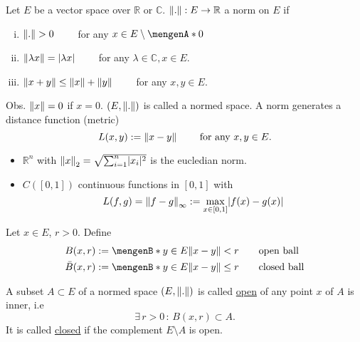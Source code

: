 \begin{definition*}
	Let $E$ be a vector space over $\mathbb{R}$ or $\mathbb{C}$. $\norm{.}:E \to \mathbb{R}$ a norm on $E$ if
	\begin{enumerate}[(i)]
		\item $\norm{.} >0 \qquad $ for any $x \in E \setminus \set{0}$
		\item $\norm{\lambda x} = \abs{\lambda x} \qquad $ for any $\lambda \in \mathbb{C},x \in E$.
		\item $\norm{x+y} \leq \norm{x} + \norm{y} \qquad$ for any $x,y \in E$.
	\end{enumerate}
	Obs. $\norm{x}=0$ if $x =0$. $(E, \norm{.})$ is called a normed space. A norm generates a distance function (metric)
	\[
		L(x,y):= \norm{x-y} \qquad \text{ for any }x,y \in E.
	\]
\end{definition*}
\begin{beispiele}
	\begin{itemize}
		\item $\mathbb{R}^n$ with $\norm{x}_2 = \sqrt{\sum^{n}_{i=1}\abs{x_i}^2}$ is the eucledian norm.
		\item $C([0,1])$ continuous functions in $[0,1]$ with
		\[
			L(f,g)=\norm{f-g}_{\infty}:= \max_{x \in [0,1]}\abs{f(x)-g(x)}
		\]
	\end{itemize}
\end{beispiele}
\begin{definition*}[balls]
	 Let $x \in E$, $r >0$. Define
	\begin{align*}
		B(x,r) &:= \set[y \in E]{\norm{x-y}<r} \qquad \text{open ball} \\
		\bar{B}(x,r) &:= \set[y \in E]{\norm{x-y}\leq r} \qquad \text{closed ball}
	\end{align*}
\end{definition*}
\begin{definition*}
	A subset $A \subset E$ of a normed space $(E,\norm{.})$ is called \underline{open} of any point $x$ of $A$ is inner, i.e 
	\[
		\exists\,r>0 \,:\, B(x,r) \subset A.
	\]
	It is called \underline{closed} if the complement $E \setminus A$ is open.
\end{definition*}
